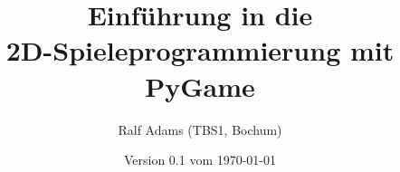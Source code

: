 \documentclass[a4paper,12pt,oneside]{scrreprt}
\begin{document}
  \title{Einführung in die\\2D-Spieleprogrammierung mit PyGame}
  \author{Ralf Adams (TBS1, Bochum)}
  \date{Version 0.1 vom \today}
  \maketitle
  \tableofcontents


\setlength{\parindent}{0.0em}
\setlength{\parskip}{1.0ex plus0.5ex minus0.5ex}
\setlength{\itemsep}{-0.3ex plus0.2ex}





 \printindex
\end{document}
